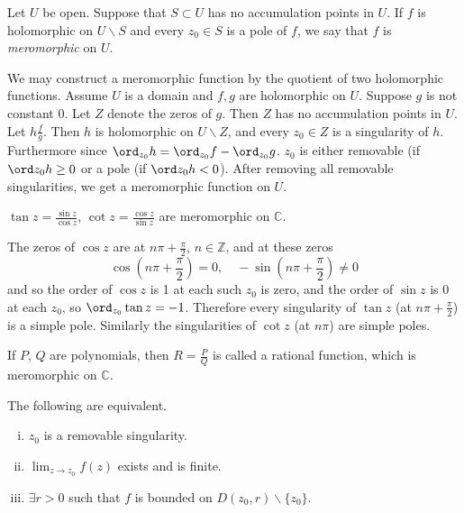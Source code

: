 \begin{defn}
Let $U$ be open. Suppose that $S \subset U$ has no accumulation points
in $U$. If $f$ is holomorphic on $U \backslash S$ and every $z_0 \in
S$
is a pole of $f$, we say that $f$ is \emph{meromorphic} on $U$.
\end{defn}

We may construct a meromorphic function by the quotient of two
holomorphic functions. Assume $U$ is a domain and $f, g$ are
holomorphic on $U$. Suppose $g$ is not constant 0. Let $Z$ denote
the zeros of $g$. Then $Z$ has no accumulation points in $U$.
Let $h \frac{f}{g}$. Then $h$ is holomorphic on $U \backslash Z$,
and every $z_0 \in Z$ is a singularity of $h$. Furthermore since
$\ord_{z_0} h = \ord_{z_0} f - \ord_{z_0} g$. $z_0$ is either
removable (if $\ord z_0 h \geq 0$ or a pole (if $\ord z_0 h < 0$).
After removing all removable singularities, we get a meromorphic
function on $U$.

\begin{xmpl}
$\tan z = \frac{\sin z}{\cos z}$, $\cot z = \frac{\cos z}{\sin z}$
are meromorphic on $\mathbb{C}$.

The zeros of $\cos z$ are at $n \pi + \frac{\pi}{2}$, $n \in
\mathbb{Z}$, and at these zeros
$$
\cos(n \pi + \frac{\pi}{2}) = 0, \quad
-\sin(n \pi + \frac{\pi}{2}) \neq 0
$$
and so the order of $\cos z$ is 1 at each such $z_0$ is
zero, and the order of $\sin z$ is 0 at each $z_0$, so
$\ord_{z_0} \tan z = -1$. Therefore every singularity of
$\tan z$ (at $n \pi + \frac{\pi}{2}$) is a simple pole.
Similarly the singularities of $\cot z$ (at $n \pi$)
are simple poles.
\end{xmpl}

\begin{defn}
If $P$, $Q$ are polynomials, then $R = \frac{P}{Q}$ is called a
rational function, which is meromorphic on $\mathbb{C}$.
\end{defn}

\begin{theorem}
  The following are equivalent.
  \begin{enumerate}[(i)]
    \item
      {
        $z_0$ is a removable singularity.
      }
    \item
      {
        $\lim_{z \to z_0} f(z)$ exists and is finite.
      }
    \item
      {
        $\exists r > 0$ such that $f$ is bounded on
        $D(z_0, r) \backslash \{ z_0 \}$.
      }
  \end{enumerate}
\end{theorem}

